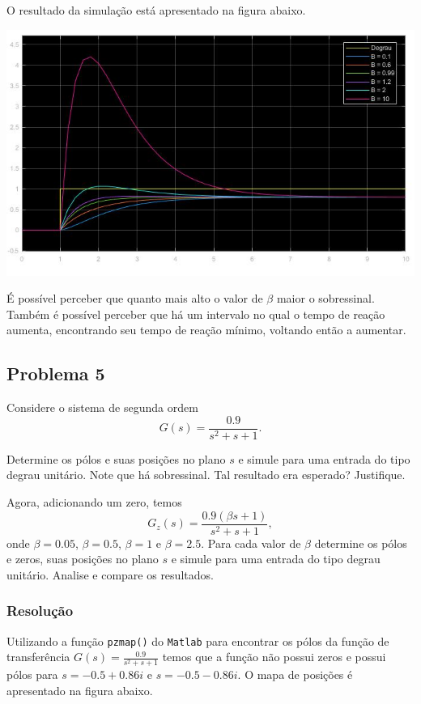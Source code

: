 \documentclass[
]{book}
\begin{document}
O resultado da simulação está apresentado na figura abaixo.

\includegraphics{Imagens/Lab2/prob4SimResult.jpg}

É possível perceber que quanto mais alto o valor de \(\beta\) maior o sobressinal. Também é possível perceber que há um intervalo no qual o tempo de reação aumenta, encontrando seu tempo de reação mínimo, voltando então a aumentar.

\hypertarget{problema-5}{%
\subsection*{Problema 5}\label{problema-5}}

Considere o sistema de segunda ordem
\[
G(s) = \frac {0.9}{s^2+s+1}.
\]

Determine os pólos e suas posições no plano \(s\) e simule para uma entrada do tipo degrau unitário. Note que há sobressinal. Tal resultado era esperado? Justifique.

Agora, adicionando um zero, temos
\[
G_z(s) = \frac {0.9(\beta s+1)}{s^2+s+1},
\]
onde \(\beta = 0.05\), \(\beta = 0.5\), \(\beta = 1\) e \(\beta = 2.5\). Para cada valor de \(\beta\) determine os pólos e zeros, suas posições no plano \(s\) e simule para uma entrada do tipo degrau unitário. Analise e compare os resultados.

\hypertarget{resoluuxe7uxe3o-4}{%
\subsubsection*{Resolução}\label{resoluuxe7uxe3o-4}}

Utilizando a função \texttt{pzmap()} do \texttt{Matlab} para encontrar os pólos da função de transferência \(G(s) = \frac {0.9}{s^2+s+1}\) temos que a função não possui zeros e possui pólos para \(s = -0.5 + 0.86i\) e \(s = -0.5 -0.86i\). O mapa de posições é apresentado na figura abaixo.
\end{document}
